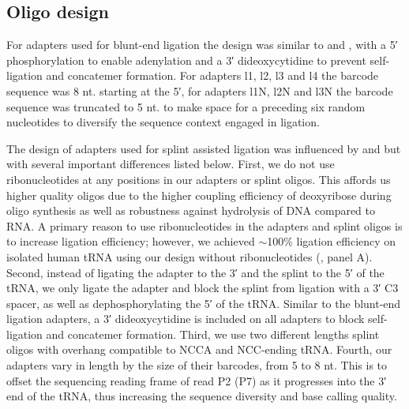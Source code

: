 \documentclass[9pt,lineno]{elife}
\begin{document}
\subsection{Oligo design}
For adapters used for blunt-end ligation the design was similar to \cite{McGlincy2017-ro} and \cite{Behrens2021-gb}, with a 5′ phosphorylation to enable adenylation and a 3′ dideoxycytidine to prevent self-ligation and concatemer formation.
For adapters l1, l2, l3 and l4 the barcode sequence was 8 nt. starting at the 5′, for adapters l1N, l2N and l3N the barcode sequence was truncated to 5 nt. to make space for a preceding six random nucleotides to diversify the sequence context engaged in ligation.

The design of adapters used for splint assisted ligation was influenced by \cite{Smith2015-ht} and \cite{Shigematsu2017-tv} but with several important differences listed below.
First, we do not use ribonucleotides at any positions in our adapters or splint oligos.
This affords us higher quality oligos due to the higher coupling efficiency of deoxyribose during oligo synthesis as well as robustness against hydrolysis of DNA compared to RNA.
A primary reason to use ribonucleotides in the adapters and splint oligos is to increase ligation efficiency; however, we achieved $\sim$100\% ligation efficiency on isolated human tRNA using our design without ribonucleotides (, panel A).
Second, instead of ligating the adapter to the 3′ and the splint to the 5′ of the tRNA, we only ligate the adapter and block the splint from ligation with a 3′ C3 spacer, as well as dephosphorylating the 5′ of the tRNA.
Similar to the blunt-end ligation adapters, a 3′ dideoxycytidine is included on all adapters to block self-ligation and concatemer formation.
Third, we use two different lengths splint oligos with overhang compatible to NCCA and NCC-ending tRNA.
Fourth, our adapters vary in length by the size of their barcodes, from 5 to 8 nt.
This is to offset the sequencing reading frame of read P2 (P7) as it progresses into the 3′ end of the tRNA, thus increasing the sequence diversity and base calling quality.
\end{document}
